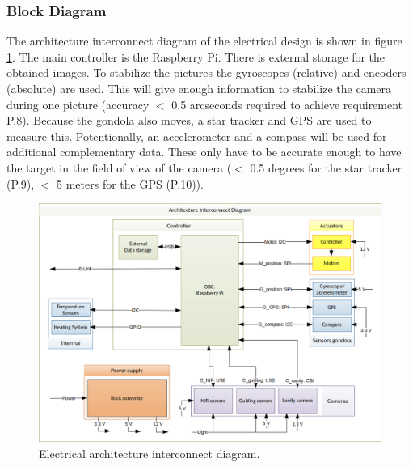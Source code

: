 \subsubsection{Block Diagram}
\label{sec:4.5.1}
The architecture interconnect diagram of the electrical design is shown in figure \ref{fig:elec-AID}. The main controller is the Raspberry Pi. There is external storage for the obtained images. To stabilize the pictures the gyroscopes (relative) and encoders (absolute) are used. This will give enough information to stabilize the camera during one picture (accuracy $<$ 0.5 arcseconds required to achieve requirement P.8). Because the gondola also moves, a star tracker and GPS are used to measure this. Potentionally, an accelerometer and a compass will be used for additional complementary data. These only have to be accurate enough to have the target in the field of view of the camera ($<$ 0.5 degrees for the star tracker (P.9), $<$ 5 meters for the GPS (P.10)).
\vspace{-.5cm}
\begin{figure}[H]
	\centering
	\includegraphics[width=.85\textwidth]{4-experiment-design/img/electrical/ArchitectureInterconnect.png}
	\caption{Electrical architecture interconnect diagram.}
	\label{fig:elec-AID}
\end{figure}


